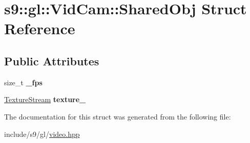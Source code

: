 \hypertarget{structs9_1_1gl_1_1VidCam_1_1SharedObj}{\section{s9\-:\-:gl\-:\-:Vid\-Cam\-:\-:Shared\-Obj Struct Reference}
\label{structs9_1_1gl_1_1VidCam_1_1SharedObj}
}
\subsection*{Public Attributes}
\begin{DoxyCompactItemize}
\item 
\hypertarget{structs9_1_1gl_1_1VidCam_1_1SharedObj_ac6d532dba32b39027e2d1814daebbb1d}{size\-\_\-t {\bfseries \-\_\-fps}}\label{structs9_1_1gl_1_1VidCam_1_1SharedObj_ac6d532dba32b39027e2d1814daebbb1d}

\item 
\hypertarget{structs9_1_1gl_1_1VidCam_1_1SharedObj_a71d73e2f8a19a8f7dafb9736dce79cbd}{\hyperlink{classs9_1_1gl_1_1TextureStream}{Texture\-Stream} {\bfseries texture\-\_\-}}\label{structs9_1_1gl_1_1VidCam_1_1SharedObj_a71d73e2f8a19a8f7dafb9736dce79cbd}

\end{DoxyCompactItemize}


The documentation for this struct was generated from the following file\-:\begin{DoxyCompactItemize}
\item 
include/s9/gl/\hyperlink{video_8hpp}{video.\-hpp}\end{DoxyCompactItemize}
